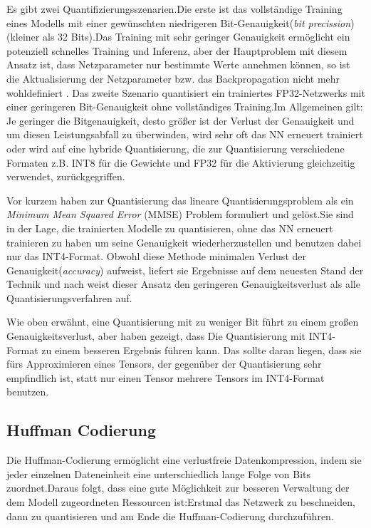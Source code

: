 \documentclass[12pt,a4paper]{scrartcl}
\numberwithin{equation}{section}
\begin{document}
Es gibt zwei Quantifizierungsszenarien.Die erste ist das vollständige Training eines Modells mit einer gewünschten niedrigeren Bit-Genauigkeit(\textit{bit precission})(kleiner als 32 Bits).Das Training mit sehr geringer Genauigkeit ermöglicht ein potenziell schnelles Training und Inferenz, aber der Hauptproblem mit diesem Ansatz ist, dass Netzparameter nur bestimmte Werte annehmen können, so ist die Aktualisierung der Netzparameter bzw. das Backpropagation nicht mehr wohldefiniert \cite{quantizationYoni}.
Das zweite Szenario  quantisiert ein trainiertes FP32-Netzwerks mit einer geringeren Bit-Genauigkeit ohne vollständiges Training.Im Allgemeinen gilt: Je geringer die Bitgenauigkeit, desto größer ist der Verlust der Genauigkeit und um diesen Leistungsabfall zu überwinden, wird sehr oft das \ac{NN} erneuert trainiert oder wird auf eine hybride Quantisierung, die zur Quantisierung verschiedene Formaten z.B. INT8 für die Gewichte und FP32 für die Aktivierung gleichzeitig verwendet,  zurückgegriffen.

Vor kurzem haben \cite[Yoni et al]{quantizationYoni} zur  Quantisierung  das lineare Quantisierungsproblem als ein \textit{Minimum Mean Squared Error} (MMSE) Problem formuliert und gelöst.Sie sind in der Lage, die trainierten Modelle zu quantisieren, ohne das \ac{NN} erneuert trainieren zu haben um seine Genauigkeit wiederherzustellen und benutzen dabei nur das INT4-Format. Obwohl diese Methode  minimalen Verlust der Genauigkeit(\textit{accuracy}) aufweist, liefert sie Ergebnisse auf dem neuesten Stand der Technik und nach \cite{quantizationYoni} weist dieser Ansatz den geringeren Genauigkeitsverlust als alle Quantisierungsverfahren auf.

Wie oben erwähnt, eine Quantisierung mit zu weniger Bit führt zu einem großen Genauigkeitsverlust, aber \cite[Yoni et al]{quantizationYoni} haben gezeigt, dass Die Quantisierung mit INT4-Format zu einem besseren Ergebnis führen kann. Das sollte daran liegen, dass sie fürs Approximieren eines Tensors, der gegenüber der Quantisierung sehr empfindlich ist, statt nur einen Tensor mehrere Tensors im INT4-Format benutzen.

\subsection{Huffman Codierung}
Die Huffman-Codierung ermöglicht eine verlustfreie Datenkompression, indem sie jeder einzelnen Dateneinheit  eine unterschiedlich lange Folge von Bits zuordnet.Daraus folgt, dass eine gute Möglichkeit zur besseren Verwaltung der dem Modell zugeordneten Ressourcen ist:Erstmal das Netzwerk zu beschneiden, dann zu quantisieren und am Ende die Huffman-Codierung durchzuführen. 
\end{document}
